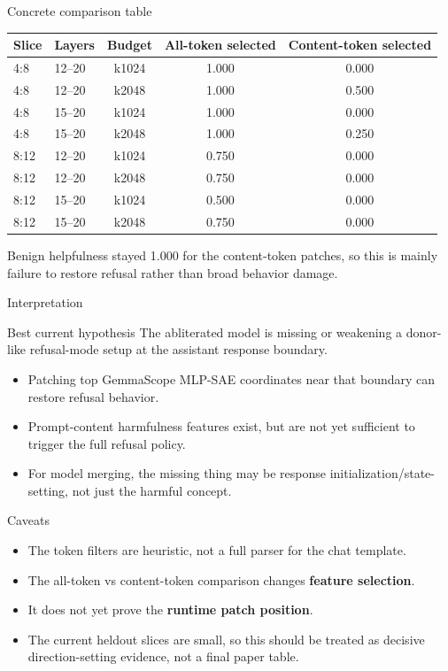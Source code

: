 \documentclass[aspectratio=169]{beamer}
\begin{document}
\begin{frame}{Concrete comparison table}
  \scriptsize
  \begin{tabular}{llccc}
    \toprule
    Slice & Layers & Budget & All-token selected & Content-token selected \\
    \midrule
    4:8 & 12--20 & k1024 & 1.000 & 0.000 \\
    4:8 & 12--20 & k2048 & 1.000 & 0.500 \\
    4:8 & 15--20 & k1024 & 1.000 & 0.000 \\
    4:8 & 15--20 & k2048 & 1.000 & 0.250 \\
    8:12 & 12--20 & k1024 & 0.750 & 0.000 \\
    8:12 & 12--20 & k2048 & 0.750 & 0.000 \\
    8:12 & 15--20 & k1024 & 0.500 & 0.000 \\
    8:12 & 15--20 & k2048 & 0.750 & 0.000 \\
    \bottomrule
  \end{tabular}
  \vspace{0.8em}

  \small Benign helpfulness stayed 1.000 for the content-token patches, so this is mainly failure to restore refusal rather than broad behavior damage.
\end{frame}

\begin{frame}{Interpretation}
  \begin{block}{Best current hypothesis}
    The abliterated model is missing or weakening a donor-like refusal-mode setup at the assistant response boundary.
  \end{block}
  \begin{itemize}
    \item Patching top GemmaScope MLP-SAE coordinates near that boundary can restore refusal behavior.
    \item Prompt-content harmfulness features exist, but are not yet sufficient to trigger the full refusal policy.
    \item For model merging, the missing thing may be response initialization/state-setting, not just the harmful concept.
  \end{itemize}
\end{frame}

\begin{frame}{Caveats}
  \begin{itemize}
    \item The token filters are heuristic, not a full parser for the chat template.
    \item The all-token vs content-token comparison changes \textbf{feature selection}.
    \item It does not yet prove the \textbf{runtime patch position}.
    \item The current heldout slices are small, so this should be treated as decisive direction-setting evidence, not a final paper table.
  \end{itemize}
\end{frame}
\end{document}
